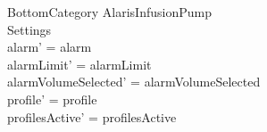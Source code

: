 \begin{schema}{BottomCategory}
	\Delta AlarisInfusionPump\\
	 Settings\\
	\where
	alarm' = alarm\\
	alarmLimit' = alarmLimit\\
	alarmVolumeSelected' = alarmVolumeSelected\\
	profile' = profile\\
	profilesActive' = profilesActive\\  
	

\end{schema}
